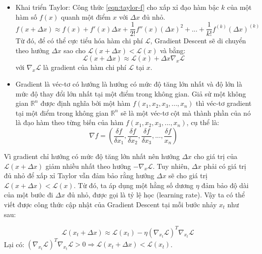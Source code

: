 \begin{itemize}
	\item Khai triển Taylor: Công thức \ref{eqn:taylor-f} cho xấp xỉ đạo hàm bậc $k$ của một hàm số $f(x)$ quanh một điểm $x$ với $\Delta x$ đủ nhỏ.
	\begin{equation} \label{eqn:taylor-f}
		f(x + \Delta x) \approx f(x) + f'(x)\Delta x + \frac{1}{2!}f''(x)(\Delta x)^2 +...+ \frac{1}{k!}f^{(k)} (\Delta x)^{(k)}
	\end{equation}
	Từ đó, để có thể cực tiểu hóa hàm chi phí $\mathcal{L}$, Gradient Descent sẽ di chuyển theo hướng $\Delta x$ sao cho $\mathcal{L}(x + \Delta x) < \mathcal{L}(x)$ và bằng:
	\begin{equation} \label{eqn:Lx-delta1}
		\mathcal{L}(x + \Delta x) \approx \mathcal{L}(x) + \Delta x\nabla_x \mathcal{L}
	\end{equation}
	với $\nabla_x\mathcal{L}$ là gradient của hàm chi phí $\mathcal{L}$ tại $x$.

	\item Gradient là véc-tơ có hướng là hướng có mức độ tăng lớn nhất và độ lớn là mức độ thay đổi lớn nhất tại một điểm trong không gian. Giả sử một không gian $\mathbb{R}^n$ được định nghĩa bởi một hàm $f(x_1,x_2,x_3,...,x_n)$ thì véc-tơ gradient tại một điểm trong không gian $\mathbb{R}^n$ sẽ là một véc-tơ cột mà thành phần của nó là đạo hàm theo từng biến của hàm $f(x_1,x_2,x_3,...,x_n)$, cụ thể là:
	\begin{equation} \label{eqn:gradf}
		\nabla f = (\frac{\delta f}{\delta x_1}, \frac{\delta f}{\delta x_2}, \frac{\delta f}{\delta x_3},...,\frac{\delta f}{x_n})
	\end{equation}
\end{itemize}

Vì gradient chỉ hướng có mức độ tăng lớn nhất nên hướng $\Delta x$ cho giá trị của $\mathcal{L} (x + \Delta x)$ giảm nhiều nhất theo hướng $-\nabla_x\mathcal{L}$. Tuy nhiên, $\Delta x$ phải có giá trị đủ nhỏ để xấp xỉ Taylor vẫn đảm bảo rằng hướng $\Delta x$ sẽ cho giá trị $\mathcal{L}(x + \Delta x) < \mathcal{L}(x)$. Từ đó, ta áp dụng một hằng số dương $\eta$ đảm bảo độ dài của một bước đi $\Delta x$ đủ nhỏ, được gọi là tỷ lệ học (learning rate). Vậy ta có thể viết được công thức cập nhật của Gradient Descent tại mỗi bước nhảy $x_t$ như sau:

\begin{equation}
	\label{eqn:Lx-delta2}
	\mathcal{L}(x_t + \Delta x) \approx \mathcal{L}(x_t) - \eta{(\nabla_{x_t} \mathcal{L})^T\nabla _{x_t}\mathcal{L}}
\end{equation}
Lại có: $(\nabla _{x_t}\mathcal{L})^T\nabla _{x_t} \mathcal{L} > 0 \Rightarrow \mathcal{L}(x_t + \Delta x) < \mathcal{L}(x_t)$.

